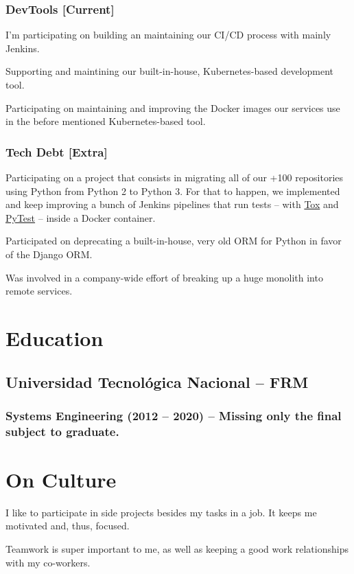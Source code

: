 \documentclass{article}
\begin{document}
\subsubsection{DevTools [Current]}
  \begin{description}
    \item I'm participating on building an maintaining our CI/CD process with mainly Jenkins.
    \item Supporting and maintining our built-in-house, Kubernetes-based development tool.
    \item Participating on maintaining and improving the Docker images our services use in the before mentioned Kubernetes-based tool.
  \end{description}
\subsubsection{Tech Debt [Extra]}
  \begin{description}
    \item Participating on a project that consists in migrating all of our +100 repositories using Python from Python 2 to Python 3.
      For that to happen, we implemented and keep improving a bunch of Jenkins pipelines that run tests – with \href{https://tox.readthedocs.io/en/latest/}{Tox} and \href{https://docs.pytest.org/en/latest/}{PyTest} – inside a Docker container.
    \item Participated on deprecating a built-in-house, very old ORM for Python in favor of the Django ORM.
    \item Was involved in a company-wide effort of breaking up a huge monolith into remote services.
  \end{description}
\section{Education}
\subsection{Universidad Tecnológica Nacional – FRM}
\subsubsection{Systems Engineering (2012 – 2020) – Missing only the final subject to graduate.}
\section{On Culture}
  \begin{description}
    \item I like to participate in side projects besides my tasks in a job. It keeps me motivated and, thus, focused.
    \item Teamwork is super important to me, as well as keeping a good work relationships with my co-workers.
  \end{description}
\end{document}
